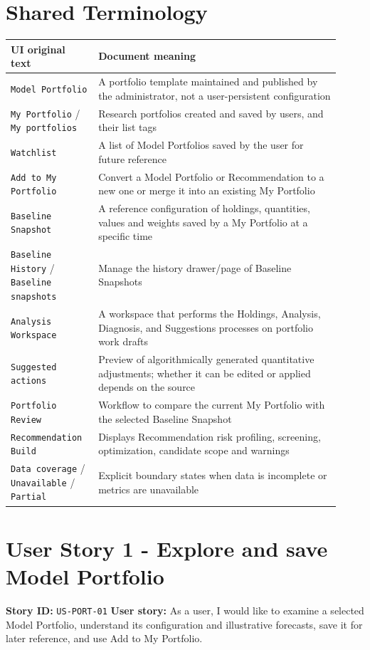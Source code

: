 \section{Shared Terminology}
\begingroup
\small
\begin{longtable}{L{0.24\linewidth}L{0.68\linewidth}}
\toprule
\textbf{UI original text} & \textbf{Document meaning} \\
\midrule
\texttt{Model Portfolio} & A portfolio template maintained and published by the administrator, not a user-persistent configuration \\
\texttt{My Portfolio} /\allowbreak{} \texttt{My portfolios} & Research portfolios created and saved by users, and their list tags \\
\texttt{Watchlist} & A list of Model Portfolios saved by the user for future reference \\
\texttt{Add to My Portfolio} & Convert a Model Portfolio or Recommendation to a new one or merge it into an existing My Portfolio \\
\texttt{Baseline Snapshot} & A reference configuration of holdings, quantities, values and weights saved by a My Portfolio at a specific time \\
\texttt{Baseline History} /\allowbreak{} \texttt{Baseline snapshots} & Manage the history drawer/\allowbreak{}page of Baseline Snapshots \\
\texttt{Analysis Workspace} & A workspace that performs the Holdings, Analysis, Diagnosis, and Suggestions processes on portfolio work drafts \\
\texttt{Suggested actions} & Preview of algorithmically generated quantitative adjustments; whether it can be edited or applied depends on the source \\
\texttt{Portfolio Review} & Workflow to compare the current My Portfolio with the selected Baseline Snapshot \\
\texttt{Recommendation Build} & Displays Recommendation risk profiling, screening, optimization, candidate scope and warnings \\
\texttt{Data coverage} /\allowbreak{} \texttt{Unavailable} /\allowbreak{} \texttt{Partial} & Explicit boundary states when data is incomplete or metrics are unavailable \\
\bottomrule
\end{longtable}
\endgroup
\prdhr
\hypertarget{us-port-01}{}
\section{User Story 1 - Explore and save Model Portfolio}
\textbf{Story ID:} \texttt{US-PORT-01}
\textbf{User story:} As a user, I would like to examine a selected Model Portfolio, understand its configuration and illustrative forecasts, save it for later reference, and use Add to My Portfolio.
